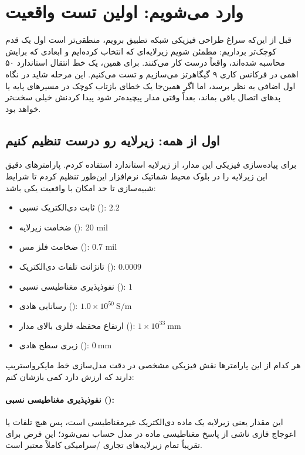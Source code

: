 \documentclass[12pt]{article}
\begin{document}
	\clearpage
	\section{وارد  می‌شویم: اولین تست واقعیت}
	
	قبل از این‌که سراغ طراحی فیزیکی شبکه تطبیق برویم، منطقی‌تر است اول یک قدم کوچک‌تر برداریم: مطمئن شویم زیرلایه‌ای که انتخاب کرده‌ایم و ابعادی که برایش محاسبه شده‌اند، واقعاً درست کار می‌کنند. برای همین، یک خط انتقال استاندارد ۵۰ اهمی در فرکانس کاری ۹ گیگاهرتز می‌سازیم و تست می‌کنیم. این مرحله شاید در نگاه اول اضافی به نظر برسد، اما اگر همین‌جا یک خطای بازتاب کوچک در مسیرهای پایه یا پدهای اتصال باقی بماند، بعداً وقتی مدار پیچیده‌تر شود پیدا کردنش خیلی سخت‌تر خواهد بود.
	
	\subsection{اول از همه: زیرلایه رو درست تنظیم کنیم}
	برای پیاده‌سازی فیزیکی این مدار، از زیرلایه استاندارد  استفاده کردم. پارامترهای دقیق این زیرلایه را در بلوک  محیط شماتیک نرم‌افزار  این‌طور تنظیم کردم تا شرایط شبیه‌سازی تا حد امکان با واقعیت یکی باشد:
	\begin{itemize}
		\item ثابت دی‌الکتریک نسبی (): $2.2$
		\item ضخامت زیرلایه (): $20 \text{ mil}$
		\item ضخامت فلز مس (): $0.7 \text{ mil}$
		\item تانژانت تلفات دی‌الکتریک (): $0.0009$
		\item نفوذپذیری مغناطیسی نسبی (): $1$
		\item رسانایی هادی (): $1.0\times 10^{50}\ \text{S/m}$
		\item ارتفاع محفظه فلزی بالای مدار (): $1\times 10^{33}\ \text{mm}$
		\item زبری سطح هادی (): $0\ \text{mm}$
	\end{itemize}
	
	هر کدام از این پارامترها نقش فیزیکی مشخصی در دقت مدل‌سازی خط مایکرواستریپ دارند که ارزش دارد کمی بازشان کنم:
	
	\paragraph{نفوذپذیری مغناطیسی نسبی ():} این مقدار یعنی زیرلایه  یک ماده دی‌الکتریک غیرمغناطیسی است، پس هیچ تلفات یا اعوجاج فازی ناشی از پاسخ مغناطیسی ماده در مدل حساب نمی‌شود؛ این فرض برای تقریباً تمام زیرلایه‌های تجاری /سرامیکی کاملاً معتبر است.
	
\end{document}
